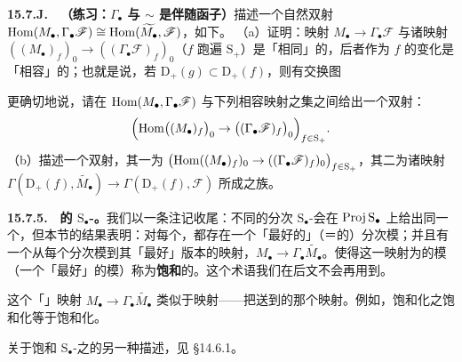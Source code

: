 \textbf{15.7.J.}\ \extrahard\ \textbf{（练习：$\Gamma_\bullet$ 与 $\sim$ 是伴随函子）}\quad 描述一个自然双射 $\operatorname{Hom}(M_\bullet,\Gamma_\bullet\mathscr{F})\cong\operatorname{Hom}(\widetilde{M_\bullet},\mathscr{F})$，如下。
（a）证明：映射 $M_\bullet\to\Gamma_\bullet\mathscr{F}$ 与诸映射 $((M_\bullet)_f)_0\to((\Gamma_\bullet\mathscr{F})_f)_0$（$f$ 跑遍 $\mathrm{S}_+$）是「相同」的，后者作为 $f$ 的变化是「相容」的；也就是说，若 $\mathrm{D}_+(g)\subset\mathrm{D}_+(f)$，则有交换图
\begin{center}
\end{center}
更确切地说，请在 $\operatorname{Hom}(M_\bullet,\Gamma_\bullet\mathscr{F})$ 与下列相容映射之集之间给出一个双射：
\[
\Bigl(\operatorname{Hom}\bigl((M_\bullet)_f\bigr)_0\to\bigl((\Gamma_\bullet\mathscr{F})_f\bigr)_0\Bigr)_{f\in\mathrm{S}_+}.
\]
（b）描述一个双射，其一为 $\bigl(\operatorname{Hom}((M_\bullet)_f)_0\to((\Gamma_\bullet\mathscr{F})_f)_0\bigr)_{f\in\mathrm{S}_+}$，其二为诸映射 $\Gamma(\mathrm{D}_+(f),\widetilde{M_\bullet})\to\Gamma(\mathrm{D}_+(f),\mathscr{F})$ 所成之族。

\textbf{15.7.5.}\ \extrahard\ \textbf{\trSaturated{}的 $\mathrm{S}_\bullet$-\trModule。}\quad 我们以一条注记收尾：不同的分次 $\mathrm{S}_\bullet$-\trModule{}会在 $\operatorname{Proj} \mathrm{S}_\bullet$ 上给出同一个\trQCSheaf，但本节的结果表明：对每个\trQCSheaf，都存在一个「最好的」（＝\trSaturated{}的）分次模；并且有一个从每个分次模到其「最好」版本的映射，$M_\bullet\to\Gamma_\bullet\widetilde{M_\bullet}$。使得这一映射为\trIsomorphism{}的模（一个「最好」的模）称为\textbf{饱和}的。这个术语我们在后文不会再用到。

这个「\trSaturation{}」映射 $M_\bullet\to\Gamma_\bullet\widetilde{M_\bullet}$ 类似于\trSheafification{}映射——把\trPresheaf{}送到\trSheaf{}的那个映射。例如，饱和化之饱和化等于饱和化。

关于饱和 $\mathrm{S}_\bullet$-\trModule{}之\trCategory{}的另一种描述，见 \S14.6.1。

